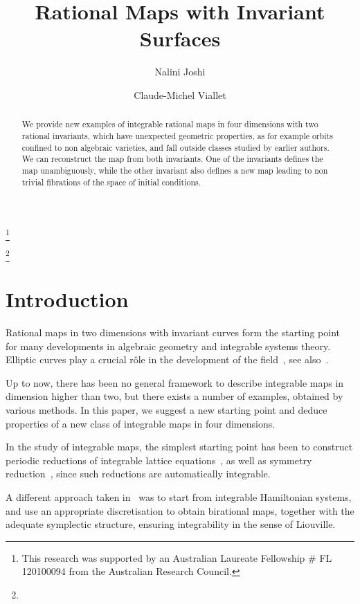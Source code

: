 \documentclass[reqno]{amsart}
\numberwithin{equation}{section}
\numberwithin{figure}{section}
\begin{document}
\title[Maps with invariant surfaces]{Rational Maps with Invariant Surfaces}

\author{Nalini Joshi}
\address{School of Mathematics and Statistics F07, The University of Sydney, NSW 2006, Australia}
\thanks{This research was supported by an Australian Laureate Fellowship \# FL 120100094 from the Australian Research Council. }

\author{Claude-Michel Viallet}
\address{ Sorbonne Universit\'e,  Centre National de
  la Recherche Scientifique \\ UMR 7589, LPTHE, 4 Place Jussieu
  \\ F-75252 Paris CEDEX 05, France }
\thanks{}


\date{}

\begin{abstract}
  We provide new examples of integrable rational maps in four
  dimensions with two rational invariants, which have unexpected
  geometric properties, {   as for example orbits confined to
    non algebraic varieties}, and fall outside classes studied by
  earlier authors. We can reconstruct the map from both invariants.
  One of the invariants defines the map unambiguously, while the other
  invariant also defines a new map leading to non trivial fibrations
  of the space of initial conditions.
\end{abstract}

\maketitle

\section{Introduction}\label{section_introduction}
Rational maps in two dimensions with invariant curves form the
starting point for many developments in algebraic geometry and
integrable systems theory. Elliptic curves play a crucial r\^ole in
the development of the
field~\cite{QuRoTh88,QuRoTh89,Sa01,KaMaNoOhYa03,Du10}, see
also~\cite{Mo43,PeSm81}.
{  
Up to now, there has been no general framework to describe integrable maps in
dimension higher than two, but there exists a number of examples,
obtained by various methods. In this paper, we suggest a new starting point and deduce properties of a new class of integrable maps in four dimensions.

In the study of integrable maps, the simplest starting point has been to construct periodic reductions of integrable lattice
equations~\cite{PaNiCa90,KaQu10}, as well as symmetry
reduction~\cite{NiPa91,LeWi06}, since such reductions are
automatically integrable.} A different approach taken in~\cite{PeSu06,PeSu16} was to start from
integrable Hamiltonian systems, and use an appropriate discretisation
to obtain birational maps, together with the adequate symplectic
structure,  ensuring integrability in the sense of Liouville.
\end{document}
